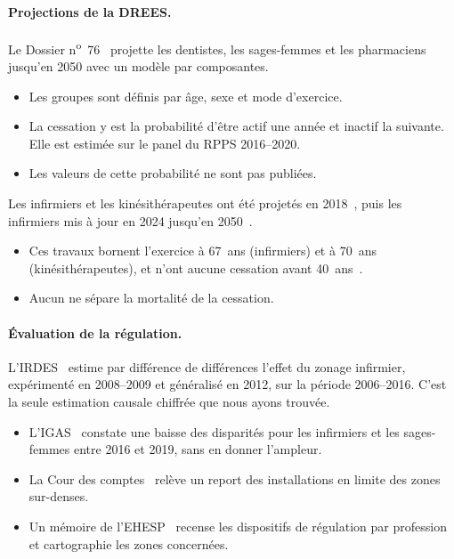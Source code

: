 \paragraph{Projections de la DREES.}
Le Dossier n\textsuperscript{o}~76~\cite{a1-dd76} projette les dentistes, les
sages-femmes et les pharmaciens jusqu'en 2050 avec un modèle par
composantes.
\begin{itemize}
\item Les groupes sont définis par âge, sexe et mode d'exercice.
\item La cessation y est la probabilité d'être actif une année et inactif la
  suivante. Elle est estimée sur le panel du RPPS 2016--2020.
\item Les valeurs de cette probabilité ne sont pas publiées.
\end{itemize}
Les infirmiers et les kinésithérapeutes ont été projetés en
2018~\cite{a1-er1062,a1-er1075}, puis les infirmiers mis à jour en 2024
jusqu'en 2050~\cite{a1-er1319}.
\begin{itemize}
\item Ces travaux bornent l'exercice à 67~ans (infirmiers) et à 70~ans
  (kinésithérapeutes), et n'ont aucune cessation avant 40~ans~\cite{a1-er1062,a1-er1075}.
\item Aucun ne sépare la mortalité de la cessation.
\end{itemize}

\paragraph{Évaluation de la régulation.}
L'IRDES~\cite{a1-irdes270} estime par différence de différences l'effet du
zonage infirmier, expérimenté en 2008--2009 et généralisé en 2012, sur la période 2006--2016. C'est la seule
estimation causale chiffrée que nous ayons trouvée.
\begin{itemize}
\item L'IGAS~\cite{a1-igas2023} constate une baisse des disparités pour les
  infirmiers et les sages-femmes entre 2016 et 2019, sans en donner
  l'ampleur.
\item La Cour des comptes~\cite{a1-ccomptes2024} relève un report des
  installations en limite des zones sur-denses.
\item Un mémoire de l'EHESP~\cite{a1-bahroun2025} recense les dispositifs de
  régulation par profession et cartographie les zones concernées.
\end{itemize}

